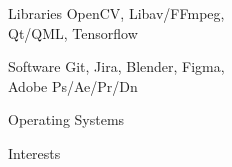 \begin{minipage}{0.25\linewidth}
\begin{sidebarSection}{Libraries}
OpenCV, Libav/FFmpeg, \\[6pt]
Qt/QML, Tensorflow
\end{sidebarSection}

\begin{sidebarSection}{Software}
Git, Jira, Blender, Figma, \\[6pt]
Adobe Ps/Ae/Pr/Dn
\end{sidebarSection}

\begin{sidebarSection}{Operating Systems}
\textcolor{black}{\LARGE{  }}
\end{sidebarSection}

\begin{sidebarSection}{Interests}
\textcolor{black}{\LARGE{ }   } %
\end{sidebarSection}

\end{minipage}



